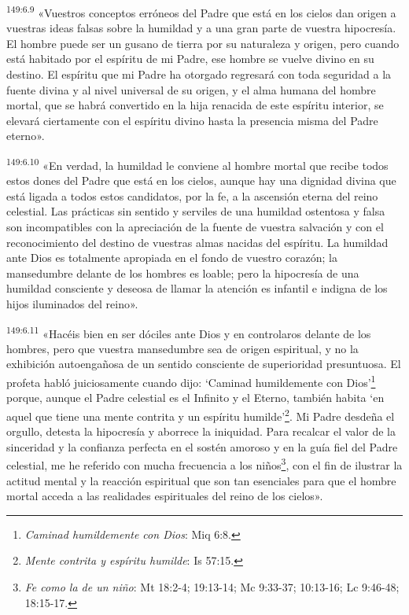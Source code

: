\par
\textsuperscript{149:6.9} «Vuestros conceptos erróneos del Padre que está en los cielos dan origen a vuestras ideas falsas sobre la humildad y a una gran parte de vuestra hipocresía. El hombre puede ser un gusano de tierra por su naturaleza y origen, pero cuando está habitado por el espíritu de mi Padre, ese hombre se vuelve divino en su destino. El espíritu que mi Padre ha otorgado regresará con toda seguridad a la fuente divina y al nivel universal de su origen, y el alma humana del hombre mortal, que se habrá convertido en la hija renacida de este espíritu interior, se elevará ciertamente con el espíritu divino hasta la presencia misma del Padre eterno».

\par
\textsuperscript{149:6.10} «En verdad, la humildad le conviene al hombre mortal que recibe todos estos dones del Padre que está en los cielos, aunque hay una dignidad divina que está ligada a todos estos candidatos, por la fe, a la ascensión eterna del reino celestial. Las prácticas sin sentido y serviles de una humildad ostentosa y falsa son incompatibles con la apreciación de la fuente de vuestra salvación y con el reconocimiento del destino de vuestras almas nacidas del espíritu. La humildad ante Dios es totalmente apropiada en el fondo de vuestro corazón; la mansedumbre delante de los hombres es loable; pero la hipocresía de una humildad consciente y deseosa de llamar la atención es infantil e indigna de los hijos iluminados del reino».

\par
\textsuperscript{149:6.11} «Hacéis bien en ser dóciles ante Dios y en controlaros delante de los hombres, pero que vuestra mansedumbre sea de origen espiritual, y no la exhibición autoengañosa de un sentido consciente de superioridad presuntuosa. El profeta habló juiciosamente cuando dijo: `Caminad humildemente con Dios'\footnote{\textit{Caminad humildemente con Dios}: Miq 6:8.} porque, aunque el Padre celestial es el Infinito y el Eterno, también habita `en aquel que tiene una mente contrita y un espíritu humilde'\footnote{\textit{Mente contrita y espíritu humilde}: Is 57:15.}. Mi Padre desdeña el orgullo, detesta la hipocresía y aborrece la iniquidad. Para recalcar el valor de la sinceridad y la confianza perfecta en el sostén amoroso y en la guía fiel del Padre celestial, me he referido con mucha frecuencia a los niños\footnote{\textit{Fe como la de un niño}: Mt 18:2-4; 19:13-14; Mc 9:33-37; 10:13-16; Lc 9:46-48; 18:15-17.}, con el fin de ilustrar la actitud mental y la reacción espiritual que son tan esenciales para que el hombre mortal acceda a las realidades espirituales del reino de los cielos».

